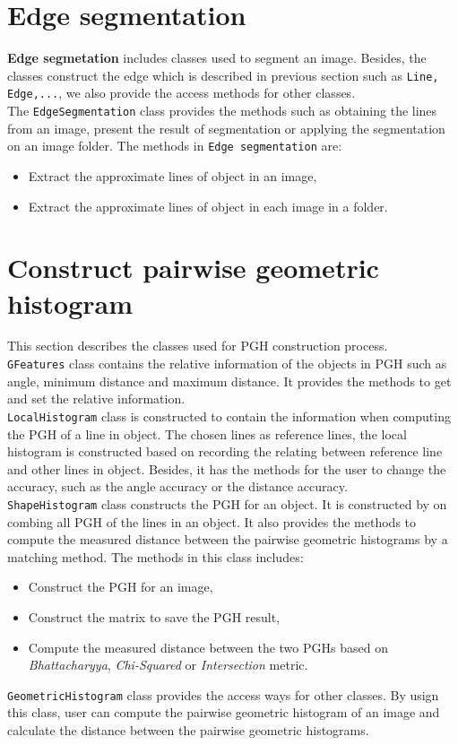 \section{Edge segmentation }
\textbf{Edge segmetation} includes classes used to segment an image. Besides, the classes construct the edge which is described in previous section such as \texttt{Line, Edge,...}, we also provide the access methods for other classes.\\[0.2cm]
The \texttt{EdgeSegmentation} class provides the methods such as obtaining the lines from an image, present the result of segmentation or applying the segmentation on an image folder. The methods in \texttt{Edge segmentation} are:
\begin{itemize}
\item Extract the approximate lines of object in an image,
\item Extract the approximate lines of object in each image in a folder.
\end{itemize}
\section{Construct pairwise geometric histogram}
This section describes the classes used for PGH construction process.\\[0.2cm]
\texttt{GFeatures} class contains the relative information of the objects in PGH such as angle, minimum distance and maximum distance. It provides the methods to get and set the relative information.\\[0.2cm]
\texttt{LocalHistogram} class is constructed to contain the information when computing the PGH of a line in object. The chosen lines as reference lines, the local histogram is constructed based on recording the relating between reference line and other lines in object. Besides, it has the methods for the user to change the accuracy, such as the angle accuracy or the distance accuracy.\\[0.2cm]
\texttt{ShapeHistogram} class constructs the PGH for an object. It is constructed by on combing all PGH of the lines in an object. It also provides the methods to compute the measured distance between the pairwise geometric histograms by a matching method. The methods in this class includes:
\begin{itemize}
\item Construct the PGH for an image,
\item Construct the matrix to save the PGH result,
\item Compute the measured distance between the two PGHs based on \textit{Bhattacharyya}, \textit{Chi-Squared} or \textit{Intersection} metric.
\end{itemize}
\texttt{GeometricHistogram} class provides the access ways for other classes. By usign this class, user can compute the pairwise geometric histogram of an image and calculate the distance between the pairwise geometric histograms.
